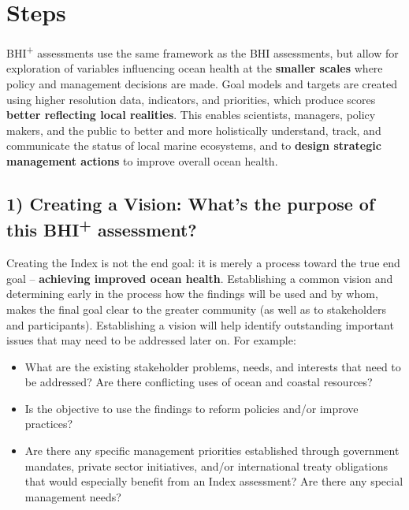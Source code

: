 \documentclass[
]{book}
\providecommand{\tightlist}{%
  \setlength{\itemsep}{0pt}\setlength{\parskip}{0pt}}
\begin{document}
\hypertarget{steps}{%
\section*{Steps}\label{steps}}

BHI\textsuperscript{+} assessments use the same framework as the BHI assessments, but allow for exploration of variables influencing ocean health at the \textbf{smaller scales} where policy and management decisions are made. Goal models and targets are created using higher resolution data, indicators, and priorities, which produce scores \textbf{better reflecting local realities}. This enables scientists, managers, policy makers, and the public to better and more holistically understand, track, and communicate the status of local marine ecosystems, and to \textbf{design strategic management actions} to improve overall ocean health.

\hypertarget{creating-a-vision-whats-the-purpose-of-this-bhi-assessment}{%
\subsection*{\texorpdfstring{1) Creating a Vision: What's the purpose of this BHI\textsuperscript{+} assessment?}{1) Creating a Vision: What's the purpose of this BHI+ assessment?}}\label{creating-a-vision-whats-the-purpose-of-this-bhi-assessment}}

Creating the Index is not the end goal: it is merely a process toward the true end goal -- \textbf{achieving improved ocean health}. Establishing a common vision and determining early in the process how the findings will be used and by whom, makes the final goal clear to the greater community (as well as to stakeholders and participants). Establishing a vision will help identify outstanding important issues that may need to be addressed later on. For example:

\begin{itemize}
\tightlist
\item
  What are the existing stakeholder problems, needs, and interests that need to be addressed? Are there conflicting uses of ocean and coastal resources?
\item
  Is the objective to use the findings to reform policies and/or improve practices?
\item
  Are there any specific management priorities established through government mandates, private sector initiatives, and/or international treaty obligations that would especially benefit from an Index assessment? Are there any special management needs?
\end{itemize}
\end{document}
